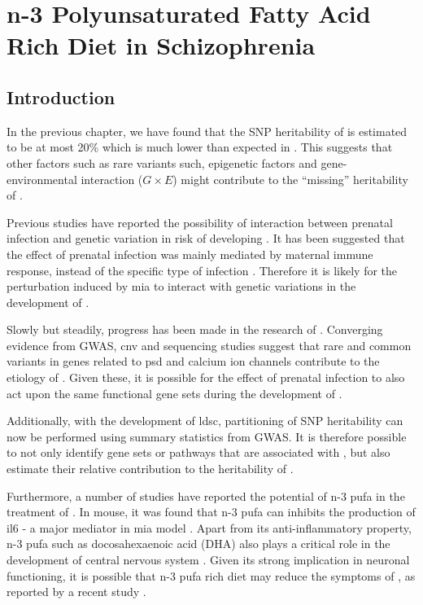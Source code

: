 \chapter{n-3 Polyunsaturated Fatty Acid Rich Diet in Schizophrenia}
\label{omegaProject}
\section{Introduction}
In the previous chapter, we have found that the \gls{SNP} heritability of  is estimated to be at most 20\% which is much lower than expected in .
This suggests that other factors such as rare variants such, epigenetic factors and gene-environmental interaction ($G\times E$) might contribute to the ``missing'' heritability of .

Previous studies have reported the possibility of interaction between prenatal infection and genetic variation in risk of developing  \citep{Tienari2004,Clarke2009}.
It has been suggested that the effect of prenatal infection was mainly mediated by maternal immune response, instead of the specific type of infection \citep{Brown2010}.
Therefore it is likely for the perturbation induced by \gls{mia} to interact with genetic variations in the development of .

Slowly but steadily, progress has been made in the research of .
Converging evidence from \gls{GWAS}, \gls{cnv} and sequencing studies suggest that rare and common variants in genes related to \gls{psd} \citep{Purcell2014,Consortium2015a} and calcium ion channels \citep{Purcell2014,Ripke2014,Szatkiewicz2014} contribute to the etiology of .
Given these, it is possible for the effect of prenatal infection to also act upon the same functional gene sets during the development of .

Additionally, with the development of \gls{ldsc}, partitioning of \gls{SNP} heritability can now be performed using summary statistics from \gls{GWAS}. 
It is therefore possible to not only identify gene sets or pathways that are associated with , but also estimate their relative contribution to the heritability of .

Furthermore, a number of studies have reported the potential of n-3 \gls{pufa} in the treatment of  \citep{Li2015,Trebble2003}. 
In mouse, it was found that n-3 \gls{pufa} can inhibits the production of \gls{il6} \citep{Trebble2003} - a major mediator in \gls{mia} model \citep{Smith2007}.
Apart from its anti-inflammatory property, n-3 \gls{pufa} such as docosahexaenoic acid (DHA) also plays a critical role in the development of central nervous system \citep{Clandinin1999,Kitajka2002}.
Given its strong implication in neuronal functioning, it is possible that n-3 \gls{pufa} rich diet may reduce the symptoms of , as reported by a recent study \citep{Li2015}.

